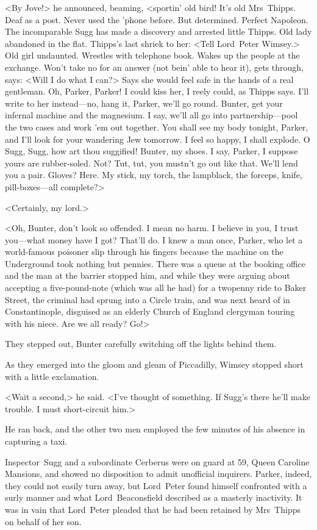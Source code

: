 <By Jove!> he announced, beaming, <sportin' old bird! It's old Mrs~Thipps. Deaf as a post. Never used the 'phone before. But determined. Perfect Napoleon. The incomparable Sugg has made a discovery and arrested little Thipps. Old lady abandoned in the flat. Thipps's last shriek to her: <Tell Lord~Peter Wimsey.> Old girl undaunted. Wrestles with telephone book. Wakes up the people at the exchange. Won't take no for an answer (not bein' able to hear it), gets through, says: <Will I do what I can?> Says she would feel safe in the hands of a real gentleman. Oh, Parker, Parker! I could kiss her, I reely could, as Thipps says. I'll write to her instead—no, hang it, Parker, we'll go round. Bunter, get your infernal machine and the magnesium. I say, we'll all go into partnership—pool the two cases and work 'em out together. You shall see my body tonight, Parker, and I'll look for your wandering Jew tomorrow. I feel so happy, I shall explode. O Sugg, Sugg, how art thou suggified! Bunter, my shoes. I say, Parker, I suppose yours are rubber-soled. Not? Tut, tut, you mustn't go out like that. We'll lend you a pair. Gloves? Here. My stick, my torch, the lampblack, the forceps, knife, pill-boxes—all complete?>

<Certainly, my lord.>

<Oh, Bunter, don't look so offended. I mean no harm. I believe in you, I trust you—what money have I got? That'll do. I knew a man once, Parker, who let a world-famous poisoner slip through his fingers because the machine on the Underground took nothing but pennies. There was a queue at the booking office and the man at the barrier stopped him, and while they were arguing about accepting a five-pound-note (which was all he had) for a twopenny ride to Baker Street, the criminal had sprung into a Circle train, and was next heard of in Constantinople, disguised as an elderly Church of England clergyman touring with his niece. Are we all ready? Go!>

They stepped out, Bunter carefully switching off the lights behind them.

As they emerged into the gloom and gleam of Piccadilly, Wimsey stopped short with a little exclamation.

<Wait a second,> he said. <I've thought of something. If Sugg's there he'll make trouble. I must short-circuit him.>

He ran back, and the other two men employed the few minutes of his absence in capturing a taxi.

Inspector~Sugg and a subordinate Cerberus were on guard at 59, Queen Caroline Mansions, and showed no disposition to admit unofficial inquirers. Parker, indeed, they could not easily turn away, but Lord~Peter found himself confronted with a surly manner and what Lord~Beaconsfield described as a masterly inactivity. It was in vain that Lord~Peter pleaded that he had been retained by Mrs~Thipps on behalf of her son.

